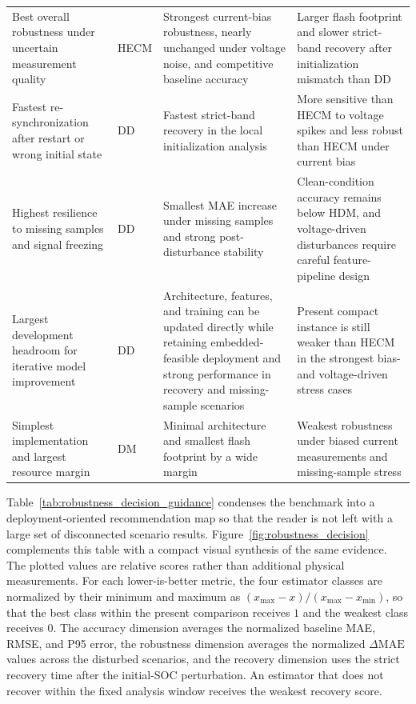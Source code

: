 \documentclass[
    a4paper,
    12pt,
    titlepage,
    bibliography=totoc,
    twoside=on,
    parskip=false,
    numbers=noenddot,
    cleardoublepage=empty,
    DIV=12,
    BCOR=12.0mm,
    headheight=36pt,
    headings=openright
]{scrreprt}
\begin{document}
\begin{longtable}{@{}>{\raggedright\arraybackslash}p{2.7cm}>{\raggedright\arraybackslash}p{2.5cm}>{\raggedright\arraybackslash}p{4.3cm}>{\raggedright\arraybackslash}p{4.3cm}@{}}
Best overall robustness under uncertain measurement quality & HECM & Strongest current-bias robustness, nearly unchanged under voltage noise, and competitive baseline accuracy & Larger flash footprint and slower strict-band recovery after initialization mismatch than DD \\
Fastest re-synchronization after restart or wrong initial state & DD & Fastest strict-band recovery in the local initialization analysis & More sensitive than HECM to voltage spikes and less robust than HECM under current bias \\
Highest resilience to missing samples and signal freezing & DD & Smallest MAE increase under missing samples and strong post-disturbance stability & Clean-condition accuracy remains below HDM, and voltage-driven disturbances require careful feature-pipeline design \\
Largest development headroom for iterative model improvement & DD & Architecture, features, and training can be updated directly while retaining embedded-feasible deployment and strong performance in recovery and missing-sample scenarios & Present compact instance is still weaker than HECM in the strongest bias- and voltage-driven stress cases \\
Simplest implementation and largest resource margin & DM & Minimal architecture and smallest flash footprint by a wide margin & Weakest robustness under biased current measurements and missing-sample stress \\
\end{longtable}
\endgroup

Table~\ref{tab:robustness_decision_guidance} condenses the benchmark into a deployment-oriented recommendation map so that the reader is not left with a large set of disconnected scenario results. Figure~\ref{fig:robustness_decision} complements this table with a compact visual synthesis of the same evidence. The plotted values are relative scores rather than additional physical measurements. For each lower-is-better metric, the four estimator classes are normalized by their minimum and maximum as $(x_{\max}-x)/(x_{\max}-x_{\min})$, so that the best class within the present comparison receives $1$ and the weakest class receives $0$. The accuracy dimension averages the normalized baseline MAE, RMSE, and P95 error, the robustness dimension averages the normalized $\Delta\mathrm{MAE}$ values across the disturbed scenarios, and the recovery dimension uses the strict recovery time after the initial-SOC perturbation. An estimator that does not recover within the fixed analysis window receives the weakest recovery score.
\end{document}
